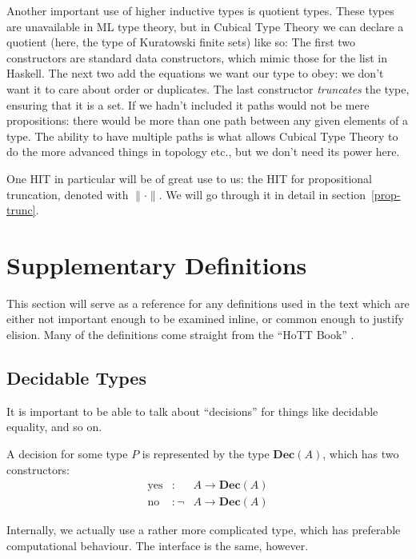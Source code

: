 \begin{refsection}
\begin{subappendices}
Another important use of higher inductive types is quotient types.
These types are unavailable in ML type theory, but in Cubical Type Theory we can
declare a quotient (here, the type of Kuratowski finite sets) like so:
The first two constructors are standard data constructors, which mimic those for
the list in Haskell.
The next two add the equations we want our type to obey: we don't want it to
care about order or duplicates.
The last constructor \emph{truncates} the type, ensuring that it is a set.
If we hadn't included it paths would not be mere propositions: there would be
more than one path between any given elements of a type.
The ability to have multiple paths is what allows Cubical Type Theory to do the
more advanced things in topology etc., but we don't need its power here.

One HIT in particular will be of great use to us: the HIT for propositional
truncation, denoted with \(\lVert \cdot \rVert\).
We will go through it in detail in section~\ref{prop-trunc}.
\section{Supplementary Definitions}
This section will serve as a reference for any definitions used in the text
which are either not important enough to be examined inline, or common enough to
justify elision.
Many of the definitions come straight from the ``HoTT Book'' \cite{hottbook}.
\subsection{Decidable Types}
It is important to be able to talk about ``decisions'' for things like decidable
equality, and so on.
\begin{definition}[Decision]
  A decision for some type \(P\) is represented by the type \(\mathbf{Dec}(A)\),
  which has two constructors:
  \begin{equation}
    \begin{alignedat}{2}
      \text{yes} &:      &A \rightarrow \mathbf{Dec}(A) \\
      \text{no}  &: \neg &A \rightarrow \mathbf{Dec}(A)
    \end{alignedat}
  \end{equation}
\end{definition}

Internally, we actually use a rather more complicated type, which has preferable
computational behaviour.
The interface is the same, however.

\end{subappendices}
\end{refsection}
